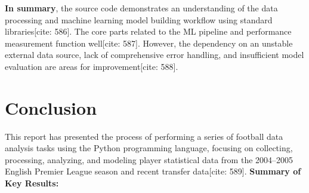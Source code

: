 \documentclass[12pt]{report}
\begin{document}
{{{\textbf{In summary}, the source code demonstrates an understanding of the data processing and machine learning model building workflow using standard libraries[cite: 586]. The core parts related to the ML pipeline and performance measurement function well[cite: 587]. However, the dependency on an unstable external data source, lack of comprehensive error handling, and insufficient model evaluation are areas for improvement[cite: 588].

\chapter*{Conclusion}
{
\noindent
This report has presented the process of performing a series of football data analysis tasks using the Python programming language, focusing on collecting, processing, analyzing, and modeling player statistical data from the 2004--2005 English Premier League season and recent transfer data[cite: 589].
\vspace{1em}
\noindent
\textbf{Summary of Key Results:}

}}}}
\end{document}
